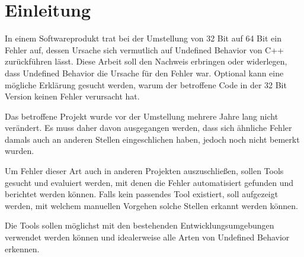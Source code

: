 \chapter{Einleitung}
\label{ch:Einleitung}

In einem Softwareprodukt trat bei der Umstellung von 32 Bit auf 64 Bit ein Fehler auf,
dessen Ursache sich vermutlich auf Undefined Behavior von C++ zurückführen lässt. Diese Arbeit soll den Nachweis erbringen oder widerlegen,
dass Undefined Behavior die Ursache für den Fehler war. Optional kann eine mögliche Erklärung gesucht werden,
warum der betroffene Code in der 32 Bit Version keinen Fehler verursacht hat.

Das betroffene Projekt wurde vor der Umstellung mehrere Jahre lang nicht verändert. Es muss daher davon ausgegangen werden,
dass sich ähnliche Fehler damals auch an anderen Stellen eingeschlichen haben, jedoch noch nicht  bemerkt wurden.

Um Fehler dieser Art auch in anderen Projekten auszuschließen, sollen Tools gesucht und evaluiert werden,
mit denen die Fehler automatisiert gefunden und berichtet werden können. Falls kein passendes Tool existiert, soll aufgezeigt werden,
mit welchem manuellen Vorgehen solche Stellen erkannt werden können.

Die Tools sollen möglichst mit den bestehenden Entwicklungsumgebungen verwendet werden können und idealerweise alle Arten von
Undefined Behavior erkennen.
